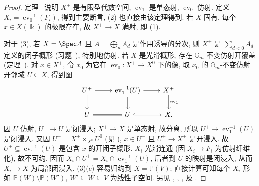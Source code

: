 \begin{proof}
定理~ 说明 $X^+$ 是有限型代数空间, $\operatorname{ev}_1$ 是单态射, $\operatorname{ev}_0$ 仿射. 定义 $X_i=\operatorname{ev}_0^{-1}(F_i)$, 得到主要断言, (2) 也直接由该定理得到. 若 $X$ 固有, 每个 $x\in X(\Bbbk)$ 的极限存在, 故 $X^+\to X$ 满射, 即 (1).

对于 (3), 若 $X=\Spec A$ 且 $A=\bigoplus_dA_d$ 是作用诱导的分次, 则 $X^+$ 是 $\sum_{d<0}A_d$ 定义的闭子概形 (习题~), 特别地仿射. 若 $X$ 是光滑概形, 存在 $\mathbb G_m$-不变仿射开覆盖 (定理~). 对 $x\in X^+$, 令 $x_0$ 为它在 $\operatorname{ev}_0:X^+\to X^0$ 下的像, 取 $x_0$ 的 $\mathbb G_m$-不变仿射开邻域 $U\subseteq X$, 得到图
\begin{align}\label{src:7.8.15}
\begin{tikzcd}[ampersand replacement=\&]
U^+\arrow[r]\arrow[d]\&\operatorname{ev}_1^{-1}(U)\arrow[r]\arrow[d]\&X^+\arrow[d,"{\operatorname{ev}_1}"]\\
U\arrow[r,equal]\&U\arrow[r,hook]\&X.
\end{tikzcd}
\end{align}
因 $U$ 仿射, $U^+\to U$ 是闭浸入; $X^+\to X$ 是单态射, 故分离, 所以 $U^+\to\operatorname{ev}_1^{-1}(U)$ 是闭浸入. 又因 $U^+=X^+\times_{X^0}U^0$ (见 ), $x\in U^+$ 且 $U^+\to X^+$ 是开浸入. 故 $U^+\subseteq\operatorname{ev}_1^{-1}(U)$ 是包含 $x$ 的开闭子概形. $X_i$ 光滑连通 (因 $X_i\to F_i$ 为仿射纤维化), 故不可约. 因而 $X_i\cap U^+=X_i\cap\operatorname{ev}_1^{-1}(U)$, 后者到 $U$ 的映射是闭浸入, 从而 $X_i\to X$ 为局部闭浸入. (3)(c) 容易归约到 $X=\mathbb P(V)$; 直接计算可知每个 $X_i$ 形如 $\mathbb P(W)\setminus\mathbb P(W')$, $W'\subseteq W\subseteq V$ 为线性子空间. 另见 \cite[定理 4.1, 4.3]{BB73}, \cite[定理 4.5, 第 69 页]{Hes81}, \cite[定理 B.0.3]{Dri13}, \cite[定理 5.27]{AHR20} 及 \cite[定理 1.5]{JS21}.


\end{proof}

